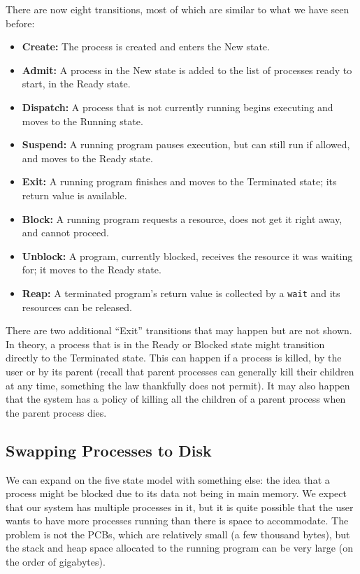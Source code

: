 There are now eight transitions, most of which are similar to what we have seen before:

\begin{itemize}
	\item \textbf{Create:} The process is created and enters the New state.
	\item \textbf{Admit:} A process in the New state is added to the list of processes ready to start, in the Ready state.
	\item \textbf{Dispatch:} A process that is not currently running begins executing and moves to the Running state.
	\item \textbf{Suspend:} A running program pauses execution, but can still run if allowed, and moves to the Ready state.
	\item \textbf{Exit:} A running program finishes and moves to the Terminated state; its return value is available.
	\item \textbf{Block:} A running program requests a resource, does not get it right away, and cannot proceed.
	\item \textbf{Unblock:} A program, currently blocked, receives the resource it was waiting for; it moves to the Ready state.
	\item \textbf{Reap:} A terminated program's return value is collected by a \texttt{wait} and its resources can be released.
\end{itemize}

There are two additional ``Exit'' transitions that may happen but are not shown. In theory, a process that is in the Ready or Blocked state might transition directly to the Terminated state. This can happen if a process is killed, by the user or by its parent (recall that parent processes can generally kill their children at any time, something the law thankfully does not permit). It may also happen that the system has a policy of killing all the children of a parent process when the parent process dies.

\subsection*{Swapping Processes to Disk}
We can expand on the five state model with something else: the idea that a process might be blocked due to its data not being in main memory. We expect that our system has multiple processes in it, but it is quite possible that the user wants to have more processes running than there is space to accommodate. The problem is not the PCBs, which are relatively small (a few thousand bytes), but the stack and heap space allocated to the running program can be very large (on the order of gigabytes).

